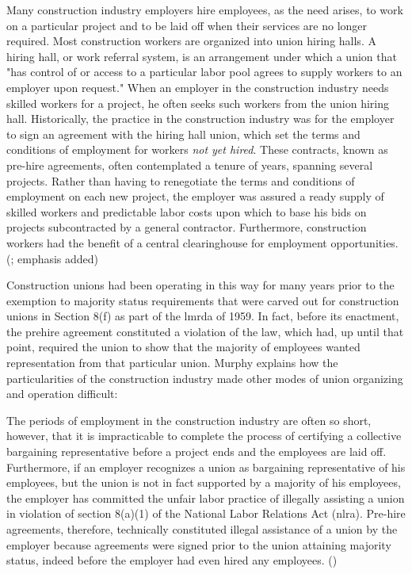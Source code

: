 \documentclass[12pt]{article}
\renewenvironment{quote}
  {\list{}{\leftmargin=\parindent\rightmargin=0pt}%
   \item\relax}
  {\endlist}
\begin{document}
\begin{quote}
Many construction industry employers hire employees, as the need arises, to work on a particular project and to be laid off when their services are no longer required. Most construction workers are organized into union hiring halls. A hiring hall, or work referral system, is an arrangement under which a union that "has control of or access to a particular labor pool agrees to supply workers to an employer upon request." When an employer in the construction industry needs skilled workers for a project, he often seeks such workers from the union hiring hall. Historically, the practice in the construction industry was for the employer to sign an agreement with the hiring hall union, which set the terms and conditions of employment for workers \textit{not yet hired}. These contracts, known as pre-hire agreements, often contemplated a tenure of years, spanning several projects. Rather than having to renegotiate the terms and conditions of employment on each new project, the employer was assured a ready supply of skilled workers and predictable labor costs upon which to base his bids on projects subcontracted by a general contractor. Furthermore, construction workers had the benefit of a central clearinghouse for employment opportunities. (\cite[1014–15]{murphyPreHireAgreementsSection1982}; emphasis added)
\end{quote}

Construction unions had been operating in this way for many years prior to the exemption to majority status requirements that were carved out for construction unions in Section 8(f) as part of the \acrshort{lmrda} of 1959. In fact, before its enactment, the prehire agreement constituted a violation of the law, which had, up until that point, required the union to show that the majority of employees wanted representation from that particular union. Murphy explains how the particularities of the construction industry made other modes of union organizing and operation difficult:

\begin{quote}
The periods of employment in the construction industry are often so short, however, that it is impracticable to complete the process of certifying a collective bargaining representative before a project ends and the employees are laid off. Furthermore, if an employer recognizes a union as bargaining representative of his employees, but the union is not in fact supported by a majority of his employees, the employer has committed the unfair labor practice of illegally assisting a union in violation of section 8(a)(1) of the National Labor Relations Act (\acrshort{nlra}). Pre-hire agreements, therefore, technically constituted illegal assistance of a union by the employer because agreements were signed prior to the union attaining majority status, indeed before the employer had even hired any employees. (\citeyear[1016–17]{murphyPreHireAgreementsSection1982})
\end{quote}
\end{document}
